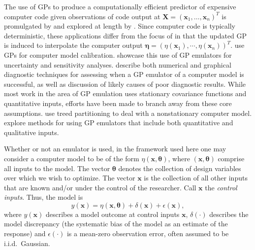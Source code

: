 \documentclass[12pt]{article}
\begin{document}
The use of GPs to produce a computationally efficient predictor of expensive computer code given observations of code output at $\mathbf X=(\mathbf x_1,\ldots,\mathbf x_n)^T$ is promulgated by \cite{Sacks1989} and explored at length by \cite{Santner2003a}.
%
Since computer code is typically deterministic, these applications differ from the focus of \cite{OHagan1978} in that the updated GP is induced to interpolate the computer output $\boldsymbol \eta = (\eta(\mathbf x_1),\cdots,\eta(\mathbf x_n))^T$. 
%
\cite{Kennedy2001} use GPs for computer model calibration. 
%
\cite{Kennedy2006} showcase this use of GP emulators for uncertainty and sensitivity analyses. 
%
\cite{Bastos2009} describe both numerical and graphical diagnostic techniques for assessing when a GP emulator of a computer model is successful, as well as discussion of likely causes of poor diagnostic results. 
%
While most work in the area of GP emulation uses stationary covariance functions 
and quantitative inputs, efforts have been made to branch away from these core assumptions. 
%
\cite{Gramacy2008} use treed partitioning to deal with a nonstationary computer model. 
%
\cite{Qian2008} explore methods for using GP emulators that include both quantitative and qualitative inputs.
%

Whether or not an emulator is used, in the framework used here one may consider a computer model to be of the form $\eta(\mathbf x,\boldsymbol \theta)$, where $(\mathbf x,\boldsymbol \theta)$ comprise all inputs to the model. 
%
The vector $\boldsymbol \theta$ denotes the collection of design variables over which we wish to optimize. 
%
The vector $\mathbf x$ is the collection of all other inputs that are known and/or under the control of the researcher.
%
Call $\mathbf x$ the \emph{control inputs}.
%
Thus, the model is
%
\begin{equation} \label{eq:model_gen}
y(\mathbf x)=\eta(\mathbf x,\boldsymbol \theta) + \delta(\mathbf x)+\epsilon(\mathbf x),
\end{equation} 
%
where $y(\mathbf x)$ describes a model outcome at control inputs $\mathbf x$, $\delta(\cdot)$ describes the model discrepancy (the systematic bias of the model as an estimate of the response) and $\epsilon(\cdot)$ is a mean-zero observation error, often assumed to be i.i.d.\ Gaussian. 
%
\end{document}
